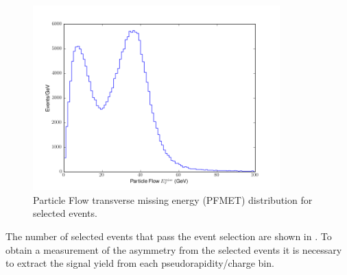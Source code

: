 \begin{figure}[htbp]
  \begin{center}
    \includegraphics*[width=0.85\textwidth]{pfmet_dist}
    \caption{Particle Flow transverse missing energy (PFMET) distribution for selected events.}
  \label{fig:pfmet}
  \end{center}
\end{figure}

The number of selected events that pass the
event selection are shown in . To obtain a
measurement of the asymmetry from the selected events it is necessary to extract
the signal yield from each pseudorapidity/charge bin.

